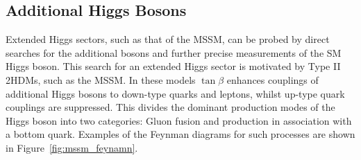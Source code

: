 \subsection{Additional Higgs Bosons} 
\label{sec:additional_higgs_bosons} 
 
Extended Higgs sectors, such as that of the MSSM, can be probed by direct searches for the additional bosons and further precise measurements of the SM Higgs boson. 
This search for an extended Higgs sector is motivated by Type II 2HDMs, such as the MSSM.
In these models $\tan\beta$ enhances couplings of additional Higgs bosons to down-type quarks and leptons, whilst up-type quark couplings are suppressed.
This divides the dominant production modes of the Higgs boson into two categories: Gluon fusion and production in association with a bottom quark.
Examples of the Feynman diagrams for such processes are shown in Figure~\ref{fig:mssm_feynamn}. \\

